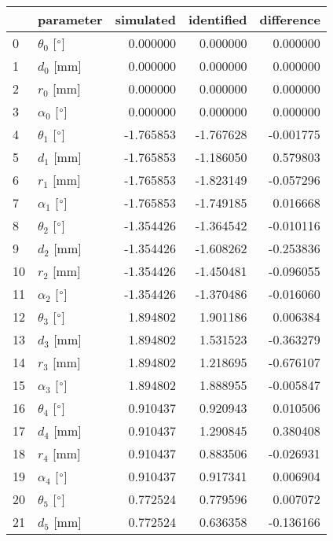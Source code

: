 \documentclass{standalone}%
\begin{document}
%
\normalsize%
\begin{tabular}{llrrr}
\toprule
{} &                 parameter & simulated & identified & difference \\
\midrule
0  &  $\theta_{0}$ [$\degree$] &  0.000000 &   0.000000 &   0.000000 \\
1  &              $d_{0}$ [mm] &  0.000000 &   0.000000 &   0.000000 \\
2  &              $r_{0}$ [mm] &  0.000000 &   0.000000 &   0.000000 \\
3  &  $\alpha_{0}$ [$\degree$] &  0.000000 &   0.000000 &   0.000000 \\
4  &  $\theta_{1}$ [$\degree$] & -1.765853 &  -1.767628 &  -0.001775 \\
5  &              $d_{1}$ [mm] & -1.765853 &  -1.186050 &   0.579803 \\
6  &              $r_{1}$ [mm] & -1.765853 &  -1.823149 &  -0.057296 \\
7  &  $\alpha_{1}$ [$\degree$] & -1.765853 &  -1.749185 &   0.016668 \\
8  &  $\theta_{2}$ [$\degree$] & -1.354426 &  -1.364542 &  -0.010116 \\
9  &              $d_{2}$ [mm] & -1.354426 &  -1.608262 &  -0.253836 \\
10 &              $r_{2}$ [mm] & -1.354426 &  -1.450481 &  -0.096055 \\
11 &  $\alpha_{2}$ [$\degree$] & -1.354426 &  -1.370486 &  -0.016060 \\
12 &  $\theta_{3}$ [$\degree$] &  1.894802 &   1.901186 &   0.006384 \\
13 &              $d_{3}$ [mm] &  1.894802 &   1.531523 &  -0.363279 \\
14 &              $r_{3}$ [mm] &  1.894802 &   1.218695 &  -0.676107 \\
15 &  $\alpha_{3}$ [$\degree$] &  1.894802 &   1.888955 &  -0.005847 \\
16 &  $\theta_{4}$ [$\degree$] &  0.910437 &   0.920943 &   0.010506 \\
17 &              $d_{4}$ [mm] &  0.910437 &   1.290845 &   0.380408 \\
18 &              $r_{4}$ [mm] &  0.910437 &   0.883506 &  -0.026931 \\
19 &  $\alpha_{4}$ [$\degree$] &  0.910437 &   0.917341 &   0.006904 \\
20 &  $\theta_{5}$ [$\degree$] &  0.772524 &   0.779596 &   0.007072 \\
21 &              $d_{5}$ [mm] &  0.772524 &   0.636358 &  -0.136166 \\

\end{tabular}
\end{document}
